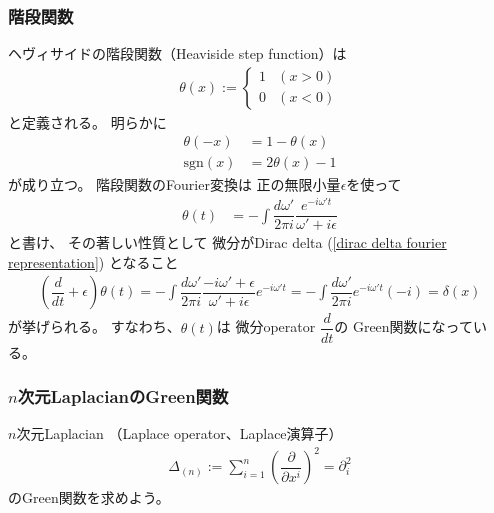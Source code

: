 \subsubsection{階段関数}

ヘヴィサイドの階段関数（Heaviside step function）は
\begin{align}
    \theta(x)
    :=
    \begin{cases}
        1 & (x > 0)
    \\
        0 & (x < 0)
    \end{cases}
\label{definition of step function}
\end{align}
と定義される。
明らかに
\begin{subequations}
\begin{align}
    \theta(- x) &= 1 - \theta(x)
\\
    \mathrm{sgn}(x)
    &=
    2 \theta(x) - 1
\label{step function and sign}
\end{align}
\end{subequations}
が成り立つ。
階段関数のFourier変換は
正の無限小量$\epsilon$を使って
\begin{align}
  \theta(t)
  &=
    - \int\dfrac{d \omega'}{2 \pi i}
    \dfrac{e^{- i \omega' t}}{\omega' + i \epsilon}
\label{fourier transformation of step function}
\end{align}
と書け、
その著しい性質として
微分がDirac delta
(\ref{dirac delta fourier representation})
となること
\begin{align}
    \left(
        \dfrac{d}{dt}
        +
        \epsilon
    \right)
    \theta(t)
=
    - \int\dfrac{d \omega'}{2 \pi i}
    \dfrac{
        - i \omega' + \epsilon
    }{\omega' + i \epsilon}
    e^{- i \omega' t}
=
    - \int\dfrac{d \omega'}{2 \pi i}
    e^{- i \omega' t}
    ( - i)
=
    \delta(x)
\label{derivative of step function}
\end{align}
が挙げられる。
すなわち、$\theta(t)$は
微分operator $\dfrac{d}{dt}$の
Green関数になっている。

\subsubsection{$n$次元LaplacianのGreen関数}

$n$次元Laplacian
（Laplace operator、Laplace演算子）
\begin{align}
    \Delta_{(n)}
    :=
    \sum_{i=1}^n
    \left(
        \dfrac{\partial}{\partial x^i}
    \right)^2
    =
    \partial_i^2
\end{align}
のGreen関数を求めよう。

